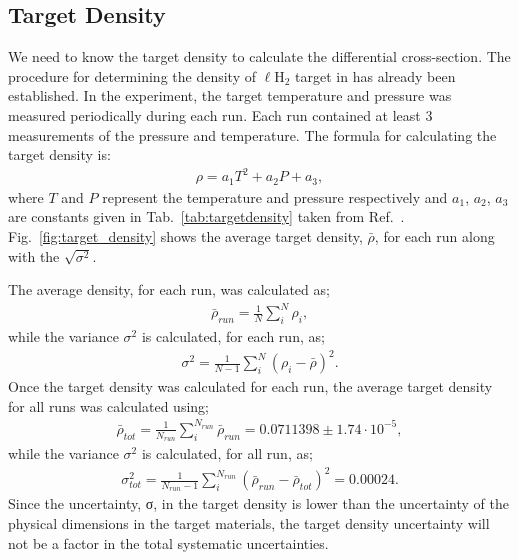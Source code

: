 \subsection{Target Density}\label{sec:analysis.target_density}

We need to know the target density to calculate the differential cross-section. The procedure for determining the density of $\ell$H$_2$ target in  has already been established\cite{clas.target.density}. In the  experiment, the target temperature and pressure was measured periodically during each run. Each run contained at least 3 measurements of the pressure and temperature. The formula for calculating the target density is:
\begin{align}
\rho = a_1 T^2 + a_2 P + a_3,
\label{eq:target_density}
\end{align}
where $T$ and $P$ represent the temperature and pressure respectively and $a_1$, $a_2$, $a_3$ are constants given in Tab.~\ref{tab:targetdensity} taken from Ref.~\cite{clas.target.density}. Fig.~\ref{fig:target_density} shows the average target density, $\bar \rho$, for each run along with the $\sqrt{\sigma^2}$.

The average density, for each run, was calculated as;
\begin{align}
\bar \rho_{run} = \frac{1}{N}\sum_i^N \rho_i,
\end{align}
while the variance $\sigma^2$ is calculated, for each run, as;
\begin{align}
\sigma^2 = \frac{1}{N - 1}\sum_i^N (\rho_i - \bar \rho)^2.
\end{align}
Once the target density was calculated for each run, the average target density for all  runs was calculated using;
\begin{align}
\bar \rho_{tot} = \frac{1}{N_{run}}\sum_i^{N_{run}} \bar \rho_{run} = 0.0711398 \pm 1.74 \cdot10^{-5},
\end{align}
while the variance $\sigma^2$ is calculated, for all  run, as;
\begin{align}
\sigma_{tot}^2 = \frac{1}{N_{run} -1}\sum_i^{N_{run}} (\bar \rho_{run} - \bar \rho_{tot})^2 = 0.00024.
\end{align}
Since the uncertainty, σ, in the target density is lower than the uncertainty of the physical dimensions in the target materials, the target density uncertainty will not be a factor in the total systematic uncertainties.

